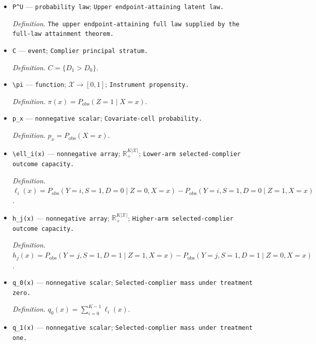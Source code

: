 \documentclass{article}
\begin{document}
\begin{itemize}
  \par\smallskip\noindent\emph{Definition.} \texttt{The lower endpoint-\allowbreak{}attaining full law supplied by the full-\allowbreak{}law attainment theorem.}
  \item \texttt{P\textasciicircum{}U} --- \texttt{probability law}; \texttt{Upper endpoint-\allowbreak{}attaining latent law.}
  \par\smallskip\noindent\emph{Definition.} \texttt{The upper endpoint-\allowbreak{}attaining full law supplied by the full-\allowbreak{}law attainment theorem.}
  \item \texttt{C} --- \texttt{event}; \texttt{Complier principal stratum.}
  \par\smallskip\noindent\emph{Definition.} \(C=\{D_1>D_0\}\).
  \item \texttt{\textbackslash{}\allowbreak{}pi} --- \texttt{function}; \(\mathcal X\to[0,1]\); \texttt{Instrument propensity.}
  \par\smallskip\noindent\emph{Definition.} \(\pi(x)=P_{\mathrm{obs}}(Z=1\mid X=x)\).
  \item \texttt{p\_\allowbreak{}x} --- \texttt{nonnegative scalar}; \texttt{Covariate-\allowbreak{}cell probability.}
  \par\smallskip\noindent\emph{Definition.} \(p_x=P_{\mathrm{obs}}(X=x)\).
  \item \texttt{\textbackslash{}\allowbreak{}ell\_\allowbreak{}i(x)} --- \texttt{nonnegative array}; \(\mathbb R_+^{K|\mathcal X|}\); \texttt{Lower-\allowbreak{}arm selected-\allowbreak{}complier outcome capacity.}
  \par\smallskip\noindent\emph{Definition.} \(\ell_i(x)=P_{\mathrm{obs}}(Y=i,S=1,D=0\mid Z=0,X=x)-P_{\mathrm{obs}}(Y=i,S=1,D=0\mid Z=1,X=x)\).
  \item \texttt{h\_\allowbreak{}j(x)} --- \texttt{nonnegative array}; \(\mathbb R_+^{K|\mathcal X|}\); \texttt{Higher-\allowbreak{}arm selected-\allowbreak{}complier outcome capacity.}
  \par\smallskip\noindent\emph{Definition.} \(h_j(x)=P_{\mathrm{obs}}(Y=j,S=1,D=1\mid Z=1,X=x)-P_{\mathrm{obs}}(Y=j,S=1,D=1\mid Z=0,X=x)\).
  \item \texttt{q\_\allowbreak{}0(x)} --- \texttt{nonnegative scalar}; \texttt{Selected-\allowbreak{}complier mass under treatment zero.}
  \par\smallskip\noindent\emph{Definition.} \(q_0(x)=\sum_{i=0}^{K-1}\ell_i(x)\).
  \item \texttt{q\_\allowbreak{}1(x)} --- \texttt{nonnegative scalar}; \texttt{Selected-\allowbreak{}complier mass under treatment one.}

\end{itemize}
\end{document}
